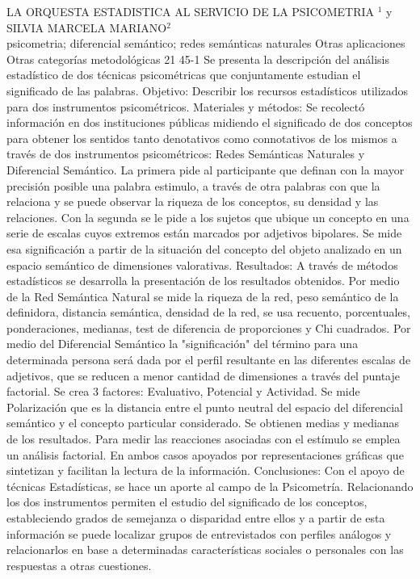 \A
{LA ORQUESTA ESTADISTICA AL SERVICIO DE LA PSICOMETRIA}
{$^1$ y SILVIA MARCELA MARIANO$^2$}
{
\\}
{psicometria; diferencial semántico; redes semánticas naturales} 
 {Otras aplicaciones} 
 {Otras categorías metodológicas} 
 {21} 
 {45-1}
{Se presenta la descripción del análisis estadístico de dos técnicas psicométricas que conjuntamente estudian el significado de las palabras. Objetivo: Describir los recursos estadísticos utilizados para dos instrumentos psicométricos. Materiales y métodos: Se recolectó información en dos instituciones públicas midiendo el significado de dos conceptos para obtener los sentidos tanto denotativos como connotativos de los mismos a través de dos instrumentos psicométricos: Redes Semánticas Naturales y Diferencial Semántico. La primera pide al participante que definan con la mayor precisión posible una palabra estimulo, a través de otra palabras con que la relaciona y se puede observar la riqueza de los conceptos, su densidad y las relaciones. Con la segunda se le pide a los sujetos que ubique un concepto en una serie de escalas cuyos extremos están marcados por adjetivos bipolares. Se mide esa significación a partir de la situación del concepto del objeto analizado en un espacio semántico de dimensiones valorativas. Resultados: A través de métodos estadísticos se desarrolla la presentación de los resultados obtenidos. Por medio de la Red Semántica Natural se mide la riqueza de la red, peso semántico de la definidora, distancia semántica, densidad de la red, se usa recuento, porcentuales, ponderaciones, medianas, test de diferencia de proporciones y Chi cuadrados. Por medio del Diferencial Semántico la "significación" del término para una determinada persona será dada por el perfil resultante en las diferentes escalas de adjetivos, que se reducen a menor cantidad de dimensiones a través del puntaje factorial. Se crea 3 factores: Evaluativo, Potencial y Actividad. Se mide Polarización que es la distancia entre el punto neutral del espacio del diferencial semántico y el concepto particular considerado. Se obtienen medias y medianas de los resultados. Para medir las reacciones asociadas con el estímulo se emplea un análisis factorial. En ambos casos apoyados por representaciones gráficas que sintetizan y facilitan la lectura de la información. Conclusiones: Con el apoyo de técnicas Estadísticas, se hace un aporte al campo de la Psicometría. Relacionando los dos instrumentos permiten el estudio del significado de los conceptos, estableciendo grados de semejanza o disparidad entre ellos y a partir de esta información se puede localizar grupos de entrevistados con perfiles análogos y relacionarlos en base a determinadas características sociales o personales con las respuestas a otras cuestiones. }
